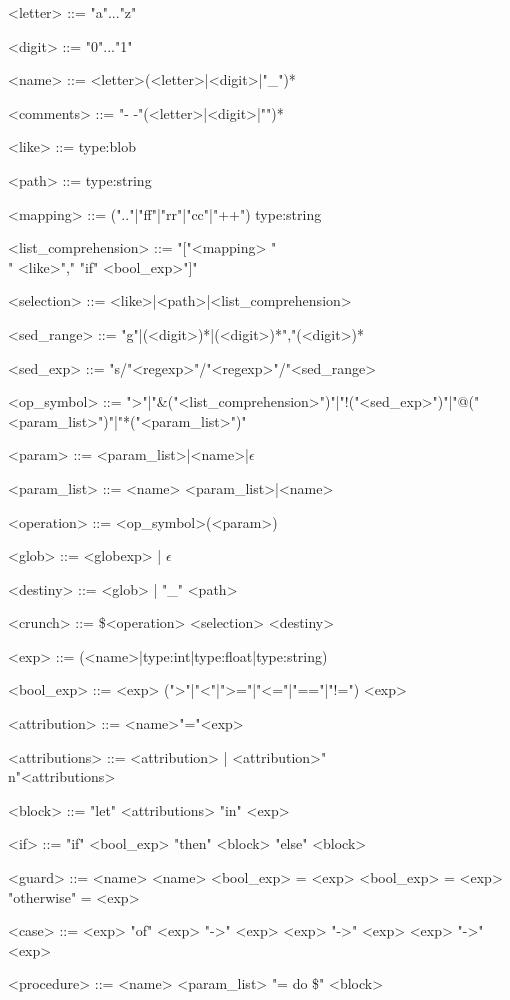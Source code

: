 \documentclass{article}
\begin{document}
\begin{grammar}
<letter> ::= "a"..."z"

<digit> ::= "0"..."1"

<name> ::= <letter>(<letter>|<digit>|"_")*

<comments> ::= "- -"(<letter>|<digit>|"\textvisiblespace")*

<like> ::= type:blob

<path> ::= type:string

<mapping> ::= (".."|"ff"|"rr"|"cc"|"++") type:string

<list_comprehension> ::= "["<mapping> "\\" <like>"," "if" <bool_exp>"]"

<selection> ::= <like>|<path>|<list_comprehension>

<sed_range> ::= "g"|(<digit>)*|(<digit>)*","(<digit>)*

<sed_exp> ::= "s/"<regexp>"/"<regexp>"/"<sed_range>

<op_symbol> ::= ">"|"\&("<list_comprehension>")"|"!("<sed_exp>")"|"@("<param_list>")"|"*("<param_list>")"

<param> ::=  <param_list>|<name>|$\epsilon$

<param_list> ::= <name> <param_list>|<name>

<operation> ::= <op_symbol>(<param>)

<glob> ::= <globexp> | $\epsilon$

<destiny> ::= <glob> | "\_" <path>

<crunch> ::= \$<operation> <selection> <destiny>

<exp> ::= (<name>|type:int|type:float|type:string)

<bool_exp> ::= <exp> (">"|"<"|">="|"<="|"=="|"!=") <exp>

<attribution> ::= <name>"="<exp>

<attributions> ::= <attribution> | <attribution>"\\n"<attributions>

<block> ::= "let" <attributions> "in" <exp>

<if> ::= "if" <bool_exp> "then" <block> \alt "else" <block>

<guard> ::= <name> <name>
\alt <bool_exp>  = <exp>
\alt <bool_exp>  = <exp>
\alt "otherwise" = <exp>

<case> ::= <exp> "of"
\alt <exp> "->" <exp>
\alt <exp> "->" <exp>
\alt <exp> "->" <exp>

<procedure> ::= <name> <param_list> "= do \$"
\alt <block>
\end{grammar}
\end{document}
